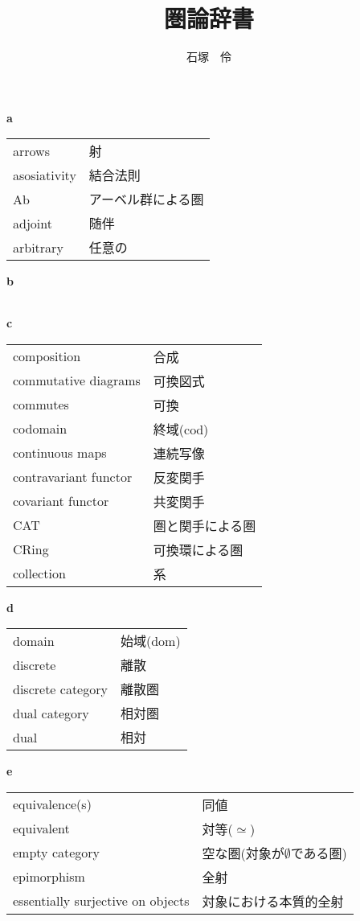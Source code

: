 \documentclass[dvipdfmx]{jsarticle}
\title{圏論辞書}
\author{石塚　伶}
\date{}
\begin{document}
\maketitle

\textbf{a}

  \begin{tabular}{ll}
    arrows & 射 \\
    asosiativity & 結合法則 \\
    Ab & アーベル群による圏 \\
    adjoint & 随伴 \\
    arbitrary & 任意の \\
  \end{tabular}

\textbf{b}

  \begin{tabular}{ll}
  \end{tabular}

\textbf{c}

  \begin{tabular}{ll}
    composition & 合成 \\
    commutative diagrams & 可換図式 \\
    commutes & 可換 \\
    codomain & 終域($\mathrm{cod}$) \\
    continuous maps & 連続写像 \\
    contravariant functor & 反変関手 \\
    covariant functor & 共変関手 \\
    CAT & 圏と関手による圏 \\
    CRing & 可換環による圏 \\
    collection & 系 \\
  \end{tabular}

\textbf{d}

  \begin{tabular}{ll}
    domain & 始域($\mathrm{dom}$) \\
    discrete & 離散 \\
    discrete category & 離散圏 \\
    dual category & 相対圏 \\
    dual & 相対 \\
  \end{tabular}

\textbf{e}

  \begin{tabular}{ll}
    equivalence(s) & 同値 \\
    equivalent & 対等($\simeq$) \\
    empty category & 空な圏(対象が$\emptyset$である圏) \\
    epimorphism & 全射 \\
    essentially surjective on objects & 対象における本質的全射 \\
  \end{tabular}
\end{document}
